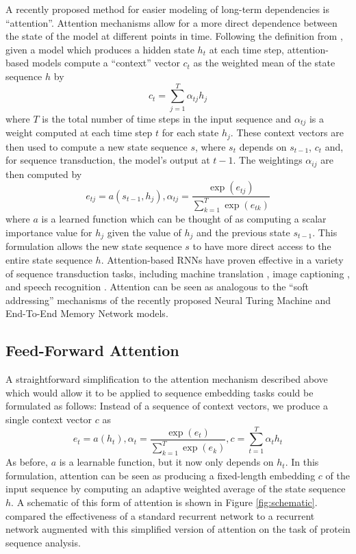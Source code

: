 \documentclass{article} %
\begin{document}
A recently proposed method for easier modeling of long-term dependencies is ``attention''.
Attention mechanisms allow for a more direct dependence between the state of the model at different points in time.
Following the definition from \cite{bahdanau2014neural}, given a model which produces a hidden state $h_t$ at each time step, attention-based models compute a ``context'' vector $c_t$ as the weighted mean of the state sequence $h$ by
$$
c_t = \sum_{j = 1}^T \alpha_{tj} h_j
$$
where $T$ is the total number of time steps in the input sequence and $\alpha_{tj}$ is a weight computed at each time step $t$ for each state $h_j$.
These context vectors are then used to compute a new state sequence $s$, where $s_t$ depends on $s_{t - 1}$, $c_t$ and, for sequence transduction, the model's output at $t - 1$.
The weightings $\alpha_{ij}$ are then computed by
\begin{equation*}
e_{tj} = a(s_{t - 1}, h_j), \alpha_{tj} = \frac{\exp(e_{tj})}{\sum_{k = 1}^T \exp(e_{tk})}
\end{equation*}
where $a$ is a learned function which can be thought of as computing a scalar importance value for $h_j$ given the value of $h_j$ and the previous state $s_{t - 1}$.
This formulation allows the new state sequence $s$ to have more direct access to the entire state sequence $h$.
Attention-based RNNs have proven effective in a variety of sequence transduction tasks, including machine translation \cite{bahdanau2014neural}, image captioning \cite{xu2015show}, and speech recognition \cite{chan2015listen,bahdanau2015end}.
Attention can be seen as analogous to the ``soft addressing'' mechanisms of the recently proposed Neural Turing Machine \cite{graves2014neural} and End-To-End Memory Network \cite{sukhbaatar2015end} models.

\subsection{Feed-Forward Attention}

A straightforward simplification to the attention mechanism described above which would allow it to be applied to sequence embedding tasks could be formulated as follows:
Instead of a sequence of context vectors, we produce a single context vector $c$ as
\begin{equation}
\label{eq:ffattention}
e_t = a(h_t), \alpha_t = \frac{\exp(e_t)}{\sum_{k = 1}^T \exp(e_k)}, c = \sum_{t = 1}^T \alpha_t h_t
\end{equation}
As before, $a$ is a learnable function, but it now only depends on $h_t$.
In this formulation, attention can be seen as producing a fixed-length embedding $c$ of the input sequence by computing an adaptive weighted average of the state sequence $h$.
A schematic of this form of attention is shown in Figure \ref{fig:schematic}.
\cite{sonderby2015convolutional} compared the effectiveness of a standard recurrent network to a recurrent network augmented with this simplified version of attention on the task of protein sequence analysis.
\end{document}
